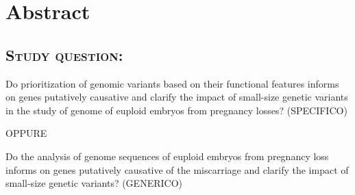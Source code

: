 \section*{Abstract}





\subsection*{\textsc{Study question:}} 
Do prioritization of genomic variants based on their functional features informs on genes putatively causative and clarify the impact of small-size genetic variants in the study of genome of euploid embryos from pregnancy losses? (SPECIFICO)  

OPPURE 

Do the analysis of genome sequences of euploid embryos from pregnancy loss informs on genes putatively causative of the miscarriage and clarify the impact of small-size genetic variants? (GENERICO) 


